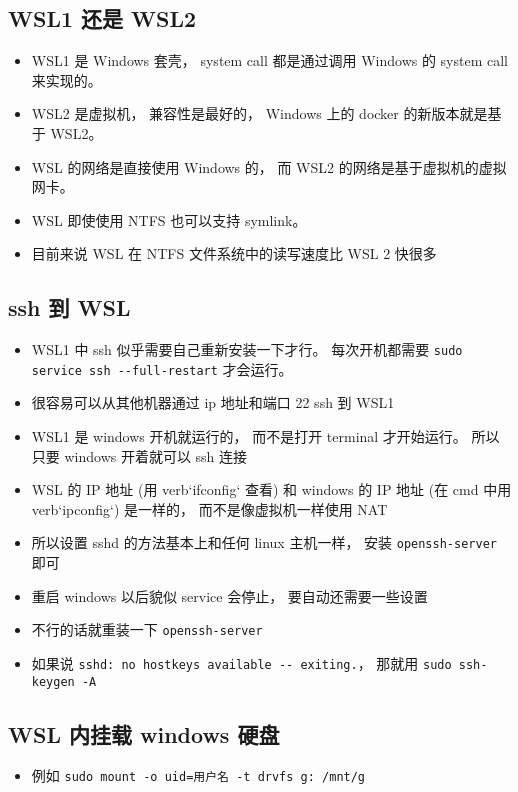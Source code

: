 \subsection{WSL1 还是 WSL2}
\begin{itemize}
\item WSL1 是 Windows 套壳， system call 都是通过调用 Windows 的 system call 来实现的。
\item WSL2 是虚拟机， 兼容性是最好的， Windows 上的 docker 的新版本就是基于 WSL2。
\item WSL 的网络是直接使用 Windows 的， 而 WSL2 的网络是基于虚拟机的虚拟网卡。
\item WSL 即使使用 NTFS 也可以支持 symlink。
\item 目前来说 WSL 在 NTFS 文件系统中的读写速度比 WSL 2 快很多
\end{itemize}

\subsection{ssh 到 WSL}
\begin{itemize}
\item WSL1 中 ssh 似乎需要自己重新安装一下才行。 每次开机都需要 \verb|sudo service ssh --full-restart| 才会运行。
\item 很容易可以从其他机器通过 ip 地址和端口 22 ssh 到 WSL1
\item WSL1 是 windows 开机就运行的， 而不是打开 terminal 才开始运行。 所以只要 windows 开着就可以 ssh 连接
\item WSL 的 IP 地址 (用 verb`ifconfig` 查看) 和 windows 的 IP 地址 (在 cmd 中用 verb`ipconfig`) 是一样的， 而不是像虚拟机一样使用 NAT
\item 所以设置 sshd 的方法基本上和任何 linux 主机一样， 安装 \verb`openssh-server` 即可
\item 重启 windows 以后貌似 service 会停止， 要自动还需要一些设置
\item 不行的话就重装一下 \verb|openssh-server|
\item 如果说 \verb|sshd: no hostkeys available -- exiting.|， 那就用 \verb|sudo ssh-keygen -A|
\end{itemize}

\subsection{WSL 内挂载 windows 硬盘}
\begin{itemize}
\item 例如 \verb`sudo mount -o uid=用户名 -t drvfs g: /mnt/g`
\end{itemize}

